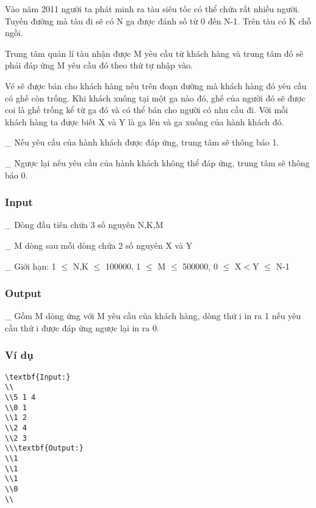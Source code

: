 



   Vào năm 2011 người ta phát minh ra tàu siêu tốc có thể chứa rất nhiều người. Tuyến đường mà tàu đi sẽ có N ga được đánh số từ 0 đến N-1. Trên tàu có K chỗ ngồi.  

   Trung tâm quản lí tàu nhận được M yêu cầu từ khách hàng và trung tâm đó sẽ phải đáp ứng M yêu cầu đó theo thứ tự nhập vào.  

   Vé sẽ được bán cho khách hàng nếu trên đoạn đường mà khách hàng đó yêu cầu có ghế còn trống. Khi khách xuống tại một ga nào đó, ghế của người đó sẽ được coi là ghế trống kể từ ga đó và có thể bán cho người có nhu cầu đi. Với mỗi khách hàng ta được biết X và Y là ga lên và ga xuống của hành khách đó.  

   \_ Nếu yêu cầu của hành khách được đáp ứng, trung tâm sẽ thông báo 1.  

   \_ Ngược lại nếu yêu cầu của hành khách không thể đáp ứng, trung tâm sẽ thông báo 0.  

\subsubsection{   Input  }

   \_ Dòng đầu tiên chứa 3 số nguyên N,K,M  

   \_ M dòng sau mỗi dòng chứa 2 số nguyên X và Y  

   \_ Giới hạn: 1 $\le$ N,K $\le$ 100000, 1 $\le$ M $\le$ 500000, 0 $\le$ X$<$Y $\le$ N-1  

\subsubsection{   Output  }

   \_ Gồm M dòng ứng với M yêu cầu của khách hàng, dòng thứ i in ra 1 nếu yêu cầu thứ i được đáp ứng ngược lại in ra 0.  

\subsubsection{   Ví dụ  }
\begin{verbatim}
\textbf{Input:}
\\
\\5 1 4
\\0 1
\\1 2
\\2 4
\\2 3
\\\textbf{Output:}
\\1
\\1
\\1
\\0
\\\end{verbatim}

